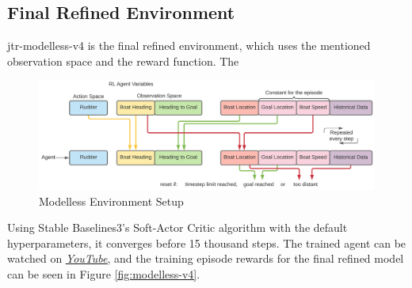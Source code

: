 \documentclass[12pt,twoside]{report}
\begin{document}
\subsection{Final Refined Environment}
jtr-modelless-v4 is the final refined environment, which uses the mentioned observation space and the reward function. The 

\begin{figure}[htbp]
\includegraphics[width=1.1\textwidth,center]{figures/Contribution/jtr-modelless.png}
\caption{Modelless Environment Setup}
\label{fig:modelless-env-setup}
\end{figure}

Using Stable Baselines3's Soft-Actor Critic algorithm with the default hyperparameters, it converges before 15 thousand steps. The trained agent can be watched on \href{https://youtu.be/uccN--r2uc0} {\underline{\textit{YouTube}}}, and the training episode rewards for the final refined model can be seen in Figure \ref{fig:modelless-v4}.
\end{document}
